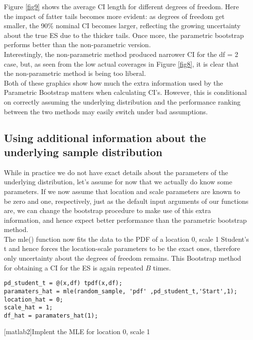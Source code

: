 \documentclass[11pt, a4paper]{article}
\begin{document}
Figure \ref{fig9} shows the average CI length for different degrees of freedom. Here the impact of fatter tails becomes more evident: as degrees of freedom get smaller, the 90\% nominal CI becomes larger, reflecting the growing uncertainty about the true ES due to the thicker tails. Once more, the parametric bootstrap performs better than the non-parametric version. \\

Interestingly, the non-parametric method produced narrower CI for the df = 2 case, but, as seen from the low actual coverages in Figure \ref{fig8}, it is clear that the non-parametric method is being too liberal. \\

Both of these graphics show how much the extra information used by the Parametric Bootstrap matters when calculating  CI's. However, this is conditional on correctly assuming the underlying distribution and the performance ranking between the two methods may easily switch under bad assumptions.\\

\subsection{Using additional information about the underlying sample distribution}
While in practice we do not have exact details about the parameters of the underlying distribution, let's assume for now that we actually do know some parameters. If we now assume that location and scale parameters are known to be zero and one, respectively, just as the default input arguments of our functions are, we can change the bootstrap procedure to make use of this extra information, and hence expect better performance than the parametric bootstrap method. \\

The mle() function now fits the data to the PDF of a location 0, scale 1 Student's t and hence forces the location-scale parameters to be the exact ones, therefore only uncertainty about the degrees of freedom remains. This Bootstrap method for obtaining a CI for the ES is again repeated $B$ times.\\


\begin{lstlisting}[style=Matlab-editor]
%Alternatively, force location=0, scale=1 and only estimate df
pd_student_t = @(x,df) tpdf(x,df);
paramaters_hat = mle(random_sample, 'pdf' ,pd_student_t,'Start',1);
location_hat = 0;
scale_hat = 1;
df_hat = paramaters_hat(1);
\end{lstlisting}
\label{MLE location 0 scale 1}
[matlab2]{Implent the MLE for location 0, scale 1\\}
\end{document}
